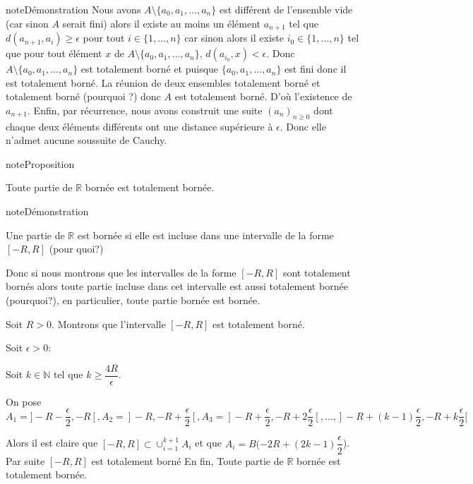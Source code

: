 \documentclass[letterpaper,10pt,french]{sphinxmanual}
\begin{document}
\begin{sphinxadmonition}{note}{Démonstration}
\sphinxAtStartPar
Nous avons \(A\setminus \{a_0, a_1, \ldots, a_n\}\) est différent de l’ensemble vide (car sinon \(A\) serait fini)
alors il existe au moins un élément \(a_{n+1}\) tel que \(d(a_{n+1}, a_i)\geq \epsilon\) pour tout \(i \in \{1, \ldots, n\}\) car sinon alors il existe \(i_0 \in \{1, \ldots, n\}\) tel que pour tout élément \(x\) de \(A\setminus \{a_0, a_1, \ldots, a_n\}\), \(d(a_{i_0}, x)<\epsilon\). Donc \(A\setminus \{a_0, a_1, \ldots, a_n\}\) est totalement borné et puisque \(\{a_0, a_1, \ldots, a_n\}\) est fini donc il est totalement borné. La réunion de deux ensembles totalement borné et totalement borné (pourquoi ?) donc \(A\) est totalement borné. D’où l’existence de \(a_{n+1}\). Enfin, par récurrence, nous avons construit une suite \((a_n)_{n\geq 0}\) dont chaque deux éléments différents ont une distance supérieure à \(\epsilon\). Donc elle n’admet aucune sous\sphinxhyphen{}suite de Cauchy.
\end{sphinxadmonition}

\begin{sphinxadmonition}{note}{Proposition}

\sphinxAtStartPar
Toute partie de \(\mathbb R\) bornée est totalement bornée.
\end{sphinxadmonition}

\begin{sphinxadmonition}{note}{Démonstration}

\sphinxAtStartPar
Une partie de \(\mathbb R\) est bornée si elle est incluse dans une intervalle de la forme \([-R, R]\) (pour quoi?)

\sphinxAtStartPar
Donc si nous montrons que les intervalles de la forme \([-R, R]\) sont totalement bornés alors toute partie incluse dans cet intervalle est aussi totalement bornée (pourquoi?), en particulier, toute partie bornée est bornée.

\sphinxAtStartPar
Soit \(R>0\). Montrons que l’intervalle \([-R, R]\) est totalement borné.

\sphinxAtStartPar
Soit \(\epsilon>0\):

\sphinxAtStartPar
Soit \(k\in \mathbb N\) tel que \(k\geq \dfrac{4R}{\epsilon}\).

\sphinxAtStartPar
On pose \(A_1 = ]-R-\dfrac{\epsilon}{2}, - R[, A_2 = ]-R, - R+\dfrac{\epsilon}{2}[, A_3 = ]-R+\dfrac{\epsilon}{2}, - R+2\dfrac{\epsilon}{2}[,\ldots, ]-R+(k-1)\dfrac{\epsilon}{2}, - R+k\dfrac{\epsilon}{2}[\)

\sphinxAtStartPar
Alors il est claire que  \( [-R, R] \subset \cup_{i=1}^{k+1}A_i\) et que \(A_i = B(-2R+(2k-1)\dfrac{\epsilon}{2}\)).
Par suite \([-R, R]\) est totalement borné
En fin, Toute partie de \(\mathbb R\) bornée est totalement bornée.
\end{sphinxadmonition}
\end{document}
